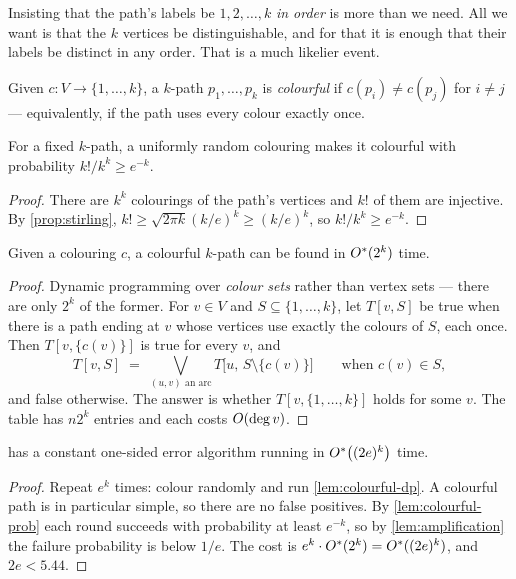 Insisting that the path's labels be $1, 2, \ldots, k$ \emph{in order} is more
than we need. All we want is that the $k$ vertices be distinguishable, and for
that it is enough that their labels be distinct in any order. That is a much
likelier event.

\begin{definition}\label{def:colourful}
Given $c : V \to \{1,\ldots,k\}$, a $k$-path $p_1,\ldots,p_k$ is
\emph{colourful} if $c(p_i) \ne c(p_j)$ for $i \ne j$ --- equivalently, if the
path uses every colour exactly once.
\end{definition}

\begin{lemma}\label{lem:colourful-prob}
For a fixed $k$-path, a uniformly random colouring makes it colourful with
probability $k!/k^k \ge e^{-k}$.
\end{lemma}

\begin{proof}
There are $k^k$ colourings of the path's vertices and $k!$ of them are
injective. By \cref{prop:stirling}, $k! \ge \sqrt{2\pi k}(k/e)^k \ge (k/e)^k$,
so $k!/k^k \ge e^{-k}$.
\end{proof}

\begin{lemma}\label{lem:colourful-dp}
Given a colouring $c$, a colourful $k$-path can be found in $O^{*}(2^k)$ time.
\end{lemma}

\begin{proof}
Dynamic programming over \emph{colour sets} rather than vertex sets --- there
are only $2^k$ of the former. For $v \in V$ and $S \subseteq \{1,\ldots,k\}$,
let $T[v,S]$ be true when there is a path ending at $v$ whose vertices use
exactly the colours of $S$, each once. Then $T[v,\{c(v)\}]$ is true for every
$v$, and
\[ T[v,S] \;=\; \bigvee_{(u,v) \text{ an arc}}
   T\bigl[u,\, S \setminus \{c(v)\}\bigr]
   \qquad \text{when } c(v) \in S, \]
and false otherwise. The answer is whether $T[v,\{1,\ldots,k\}]$ holds for some
$v$. The table has $n2^k$ entries and each costs $O\!\left(\deg v\right)$.
\end{proof}

\begin{theorem}\label{thm:colour-coding-2}
 has a constant one-sided error algorithm running in
$O^{*}\bigl((2e)^k\bigr)$ time.
\end{theorem}

\begin{proof}
Repeat $e^k$ times: colour randomly and run \cref{lem:colourful-dp}. A colourful
path is in particular simple, so there are no false positives. By
\cref{lem:colourful-prob} each round succeeds with probability at least
$e^{-k}$, so by \cref{lem:amplification} the failure probability is below
$1/e$. The cost is $e^k \cdot O^{*}(2^k) = O^{*}((2e)^k)$, and
$2e < 5.44$.
\end{proof}

